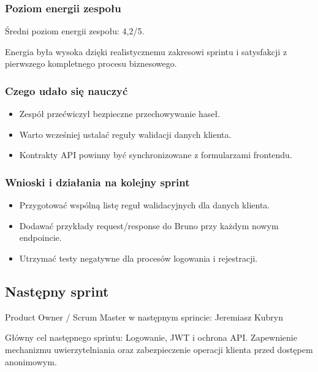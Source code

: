 \documentclass[12pt,a4paper]{article}
\begin{document}
\subsubsection*{Poziom energii zespołu}
Średni poziom energii zespołu: 4,2/5.

Energia była wysoka dzięki realistycznemu zakresowi sprintu i satysfakcji z pierwszego kompletnego procesu biznesowego.

\subsubsection*{Czego udało się nauczyć}
\begin{itemize}
\item Zespół przećwiczył bezpieczne przechowywanie haseł.
\item Warto wcześniej ustalać reguły walidacji danych klienta.
\item Kontrakty API powinny być synchronizowane z formularzami frontendu.
\end{itemize}
\subsubsection*{Wnioski i działania na kolejny sprint}
\begin{itemize}
\item Przygotować wspólną listę reguł walidacyjnych dla danych klienta.
\item Dodawać przykłady request/response do Bruno przy każdym nowym endpoincie.
\item Utrzymać testy negatywne dla procesów logowania i rejestracji.
\end{itemize}

\subsection*{Następny sprint}
Product Owner / Scrum Master w następnym sprincie: Jeremiasz Kubryn

Główny cel następnego sprintu: Logowanie, JWT i ochrona API. Zapewnienie mechanizmu uwierzytelniania oraz zabezpieczenie operacji klienta przed dostępem anonimowym.
\end{document}
